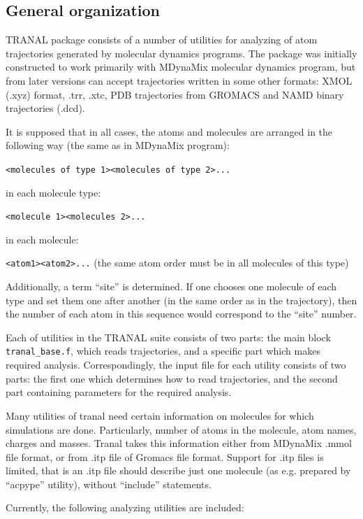 \documentclass{article}
\begin{document}
\subsection{General organization}

TRANAL package consists of a number of utilities for analyzing of atom 
trajectories generated by molecular dynamics programs. The package
was initially constructed to work primarily with MDynaMix molecular
dynamics program, but from later versions can accept trajectories written
in some other formats: XMOL (.xyz) format, .trr, .xtc,  PDB trajectories from
GROMACS and NAMD binary trajectories (.dcd).

It is supposed that in all cases, the atoms and molecules are arranged
in the following way (the same as in MDynaMix program):

\verb|<molecules of type 1><molecules of type 2>...|

in each molecule type:

\verb|<molecule 1><molecules 2>...|

in each molecule:

\verb|<atom1><atom2>...|
(the same atom order must be in all molecules of this type)

Additionally, a term ``site'' is determined. If one chooses one molecule
of each type and set them one after another (in the same order as in the
trajectory), then the number of each atom in this sequence would correspond
to the ``site'' number. 

Each of utilities in the TRANAL suite consists of two parts: the main block 
\verb|tranal_base.f|,
which reads trajectories, and a specific part which makes required 
analysis. Correspondingly, the input file for each utility consists of 
two parts: the first one which determines how to read trajectories, and
the second part containing parameters for the required analysis.

Many utilities of tranal need certain information on molecules for
which simulations are done. Particularly, number of atoms in the molecule,
atom names, charges and masses. Tranal  takes this information either
from MDynaMix .mmol file format, or from .itp file of Gromacs file format.
Support for .itp files is limited, that is an .itp file should describe just
one molecule (as e.g. prepared by ``acpype'' utility), without ``include''
statements.

Currently, the following analyzing utilities are included:
\end{document}
